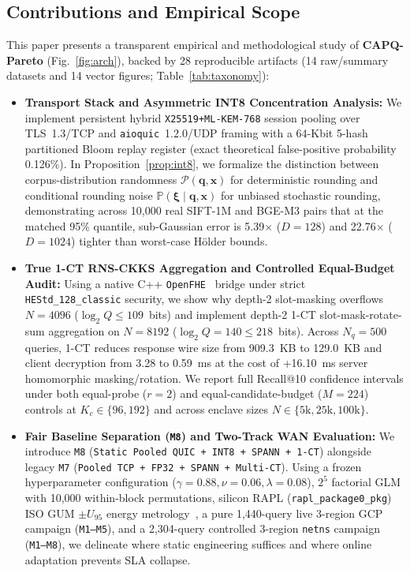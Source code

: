 \documentclass[10pt,journal,compsoc]{IEEEtran}
\begin{document}
\subsection{Contributions and Empirical Scope}
This paper presents a transparent empirical and methodological study of \textbf{CAPQ-Pareto} (Fig.~\ref{fig:arch}), backed by 28 reproducible artifacts (14 raw/summary datasets and 14 vector figures; Table~\ref{tab:taxonomy}):
\begin{itemize}
\item \textbf{Transport Stack and Asymmetric INT8 Concentration Analysis:} We implement persistent hybrid \nolinkurl{X25519+ML-KEM-768} session pooling over TLS~1.3/TCP and \texttt{aioquic}~1.2.0/UDP framing with a 64-Kbit 5-hash partitioned Bloom replay register (exact theoretical false-positive probability 0.126\%). In Proposition~\ref{prop:int8}, we formalize the distinction between corpus-distribution randomness $\mathcal{P}(\mathbf{q},\mathbf{x})$ for deterministic rounding and conditional rounding noise $\mathbb{P}(\boldsymbol{\xi}\mid\mathbf{q},\mathbf{x})$ for unbiased stochastic rounding, demonstrating across 10,000 real SIFT-1M and BGE-M3 pairs that at the matched 95\% quantile, sub-Gaussian error is 5.39$\times$ ($D=128$) and 22.76$\times$ ($D=1024$) tighter than worst-case H\"older bounds.
\item \textbf{True 1-CT RNS-CKKS Aggregation and Controlled Equal-Budget Audit:} Using a native C++ \texttt{OpenFHE}~\cite{albadawi2022openfhe} bridge under strict \nolinkurl{HEStd_128_classic} security, we show why depth-2 slot-masking overflows $N=4096$ ($\log_2 Q \le 109$~bits) and implement depth-2 1-CT slot-mask-rotate-sum aggregation on $N=8192$ ($\log_2 Q = 140 \le 218$~bits). Across $N_q = 500$ queries, 1-CT reduces response wire size from 909.3~KB to 129.0~KB and client decryption from 3.28 to 0.59~ms at the cost of +16.10~ms server homomorphic masking/rotation. We report full Recall@10 confidence intervals under both equal-probe ($r=2$) and equal-candidate-budget ($M=224$) controls at $K_c \in \{96, 192\}$ and across enclave sizes $N \in \{5\text{k}, 25\text{k}, 100\text{k}\}$.
\item \textbf{Fair Baseline Separation (\texttt{M8}) and Two-Track WAN Evaluation:} We introduce \texttt{M8} (\texttt{Static Pooled QUIC + INT8 + SPANN + 1-CT}) alongside legacy \texttt{M7} (\texttt{Pooled TCP + FP32 + SPANN + Multi-CT}). Using a frozen hyperparameter configuration ($\gamma=0.88, \nu=0.06, \lambda=0.08$), $2^5$ factorial GLM with 10,000 within-block permutations, silicon RAPL (\nolinkurl{rapl_package0_pkg}) ISO GUM $\pm U_{95}$ energy metrology~\cite{khan2018rapl,iso_gum_2008}, a pure 1,440-query live 3-region GCP campaign (\texttt{M1--M5}), and a 2,304-query controlled 3-region \texttt{netns} campaign (\texttt{M1--M8}), we delineate where static engineering suffices and where online adaptation prevents SLA collapse.
\end{itemize}
\end{document}
